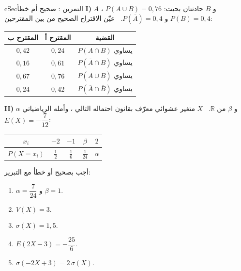 \documentclass[12pt,a4paper]{article}
\newenvironment{BOX}[2]{\begin{otherlanguage}{english}\begin{arbox}{#1}{#2}}{\end{arbox}\end{otherlanguage}}
\newcounter{exo}
\newenvironment{tamrin}[1]{\stepcounter{exo}\begin{BOX}{cSec}{التمرين \theexo: #1}}{\end{BOX}}
\newcommand{\ar}[1]{\foreignlanguage{arabic}{#1}}
\newcommand{\R}{\mathbb{R}}
\begin{document}
\begin{tamrin}{صحيح أم خطأ}
\textbf{I)} $A$ و $B$ حادثتان بحيث: $P(A\cup B)=0{,}76$ ، $P(B)=0{,}4$ و $P(\overline A)=0{,}4$. \ عيّن الاقتراح الصحيح من بين المقترحين:
\begin{center}
\renewcommand{\arraystretch}{1.4}
\begin{tabular}{|c|c|C|}\hline
\ar{المقترح ب} & \ar{المقترح أ} & القضية\\
\hline
$0{,}42$ & $0{,}24$ & $P(A\cap B)$ يساوي\\
\hline
$0{,}16$ & $0{,}61$ & $P(\overline A\cap B)$ يساوي\\
\hline
$0{,}67$ & $0{,}76$ & $P(\overline A\cup\overline B)$ يساوي\\
\hline
$0{,}24$ & $0{,}42$ & $P(\overline A\cap\overline B)$ يساوي\\
\hline
\end{tabular}
\end{center}
\textbf{II)} $\alpha$ و $\beta$ من $\R$. \ $X$ متغير عشوائي معرّف بقانون احتماله التالي ، وأمله الرياضياتي $E(X)=-\dfrac{7}{12}$:
\begin{center}
\renewcommand{\arraystretch}{1.4}
\begin{tabular}{|C|c|c|c|c|}\hline
{}$x_i$ & $-2$ & $-1$ & $\beta$ & $2$\\
\hline
$P(X=x_i)$ & $\frac12$ & $\frac16$ & $\frac{1}{24}$ & $\alpha$\\
\hline
\end{tabular}
\end{center}
أجب بصحيح أو خطأ مع التبرير:
\begin{enumerate}
\item $\alpha=\dfrac{7}{24}$ و $\beta=1$.
\item $V(X)=3$.
\item $\sigma(X)=1{,}5$.
\item $E(2X-3)=-\dfrac{25}{6}$.
\item $\sigma(-2X+3)=2\,\sigma(X)$.
\end{enumerate}
\end{tamrin}

\end{document}
